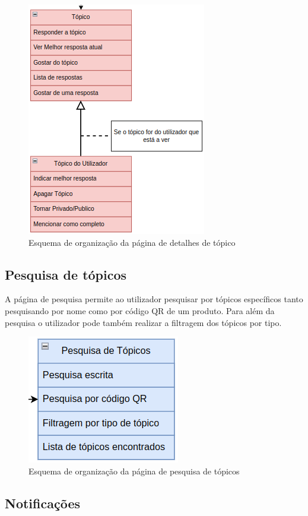 \begin{figure}[htb]
    \centering
    
    \includegraphics[height=0.55\textwidth]{images/Arquiteturas/superficial_de_app/detalhes_topico.png}
    \caption{Esquema de organização da página de detalhes de tópico}
    \label{fig:7}
\end{figure}

\subsection{Pesquisa de tópicos}

A página de pesquisa permite ao utilizador pesquisar por tópicos específicos tanto pesquisando por nome como 
por código QR de um produto. Para além da pesquisa o utilizador pode também realizar a filtragem dos 
tópicos por tipo.
\begin{figure}[htb]
    \centering
    
    \includegraphics[height=0.3\textwidth]{images/Arquiteturas/superficial_de_app/pesquisa_forum.png}
    \caption{Esquema de organização da página de pesquisa de tópicos}
    \label{fig:8}
\end{figure}

\subsection{Notificações}


